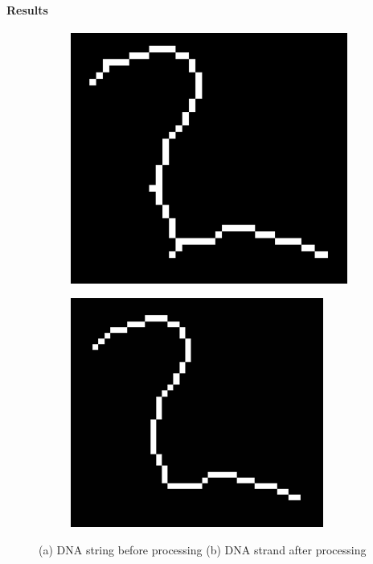 \documentclass{article}
\begin{document}
\paragraph{Results}
\begin{figure}[H]
	\centering
	\begin{subfigure}[b]{0.32\textwidth}
		\includegraphics[width=\linewidth]{preprocessed}
		\caption{}
		\label{fig:preprocImageLength}
	\end{subfigure}
	\hspace{5mm}
	\begin{subfigure}[b]{0.32\textwidth}
		\includegraphics[width=\linewidth]{processed}
		\caption{}
		\label{fig:pastprocImageLength}
	\end{subfigure}
	\captionsetup{justification=centering}
	\caption{(a) DNA string before processing (b) DNA strand after processing}
	\label{fig:LengthsThingiesReference} %
\end{figure}
\end{document}
